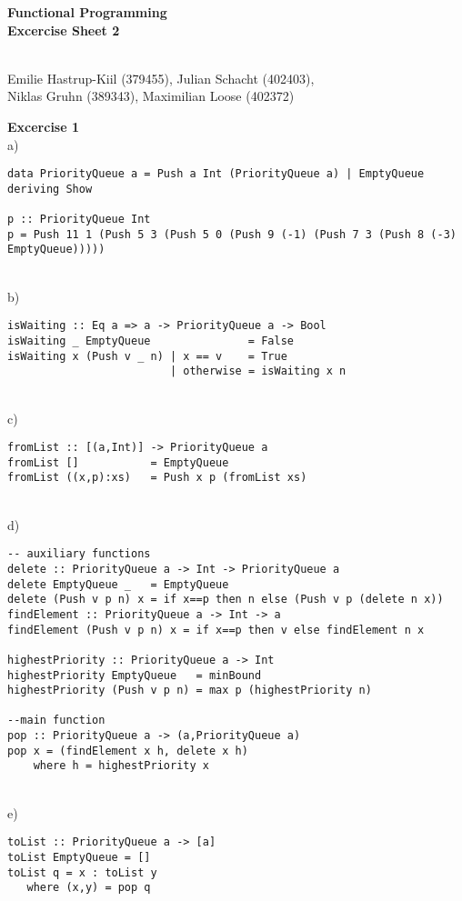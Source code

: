 \documentclass[a4paper,12pt,oneside]{book}
\begin{document}
\setlength{\parindent}{0em} 


\begin{center} 
\textbf{\huge{Functional Programming} \\ \large{ Excercise Sheet 2}} %

~\\
Emilie Hastrup-Kiil (379455), 
Julian Schacht (402403), \\
Niklas Gruhn (389343), 
Maximilian Loose (402372)
\end{center}
\textbf{Excercise 1} \\ %
a)
\begin{lstlisting}
data PriorityQueue a = Push a Int (PriorityQueue a) | EmptyQueue deriving Show

p :: PriorityQueue Int
p = Push 11 1 (Push 5 3 (Push 5 0 (Push 9 (-1) (Push 7 3 (Push 8 (-3) EmptyQueue)))))
\end{lstlisting}
~\\
b)
\begin{lstlisting}
isWaiting :: Eq a => a -> PriorityQueue a -> Bool
isWaiting _ EmptyQueue               = False
isWaiting x (Push v _ n) | x == v    = True
                         | otherwise = isWaiting x n
\end{lstlisting}
~\\           
c)
\begin{lstlisting}
fromList :: [(a,Int)] -> PriorityQueue a
fromList []           = EmptyQueue
fromList ((x,p):xs)   = Push x p (fromList xs)
\end{lstlisting}
~\\
d)
\begin{lstlisting}
-- auxiliary functions
delete :: PriorityQueue a -> Int -> PriorityQueue a
delete EmptyQueue _   = EmptyQueue
delete (Push v p n) x = if x==p then n else (Push v p (delete n x)) 
findElement :: PriorityQueue a -> Int -> a
findElement (Push v p n) x = if x==p then v else findElement n x

highestPriority :: PriorityQueue a -> Int
highestPriority EmptyQueue   = minBound
highestPriority (Push v p n) = max p (highestPriority n)

--main function
pop :: PriorityQueue a -> (a,PriorityQueue a)
pop x = (findElement x h, delete x h)
    where h = highestPriority x
\end{lstlisting}
~\\
e)
\begin{lstlisting}
toList :: PriorityQueue a -> [a]
toList EmptyQueue = []
toList q = x : toList y
   where (x,y) = pop q
\end{lstlisting}
\end{document}
